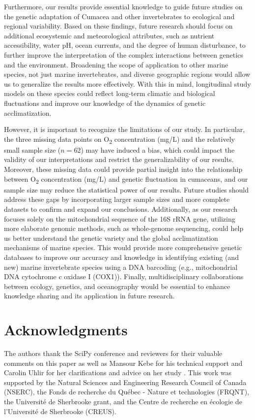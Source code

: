 Furthermore, our results provide essential knowledge to guide future studies on the genetic adaptation of Cumacea and other invertebrates to ecological and regional variability. Based on these findings, future research should focus on additional ecosystemic and meteorological attributes, such as nutrient accessibility, water pH, ocean currents, and the degree of human disturbance, to further improve the interpretation of the complex interactions between genetics and the environment. Broadening the scope of application to other marine species, not just marine invertebrates, and diverse geographic regions would allow us to generalize the results more effectively. With this in mind, longitudinal study models on these species could reflect long-term climatic and biological fluctuations and improve our knowledge of the dynamics of genetic acclimatization.

However, it is important to recognize the limitations of our study. In particular, the three missing data points on O\textsubscript{2} concentration (mg/L) and the relatively small sample size ($n=62$) may have induced a bias, which could impact the validity of our interpretations and restrict the generalizability of our results. Moreover, these missing data could provide partial insight into the relationship between O\textsubscript{2} concentration (mg/L) and genetic fluctuation in cumaceans, and our sample size may reduce the statistical power of our results. Future studies should address these gaps by incorporating larger sample sizes and more complete datasets to confirm and expand our conclusions. Additionally, as our research focuses solely on the mitochondrial sequence of the 16S rRNA gene, utilizing more elaborate genomic methods, such as whole-genome sequencing, could help us better understand the genetic variety and the global acclimatization mechanisms of marine species. This would provide more comprehensive genetic databases to improve our accuracy and knowledge in identifying existing (and new) marine invertebrate species using a DNA barcoding (e.g., mitochondrial DNA cytochrome c oxidase I (COX1)). Finally, multidisciplinary collaborations between ecology, genetics, and oceanography would be essential to enhance knowledge sharing and its application in future research.

\section{Acknowledgments}\label{acknowledgments}
The authors thank the SciPy conference and reviewers for their valuable comments on this paper as well as Mansour Kebe for his technical support and Carolin Uhlir for her clarifications and advice on her study \citep{uhlir_adding_2021}. This work was supported by the Natural Sciences and Engineering Research Council of Canada (NSERC), the Fonds de recherche du Québec - Nature et technologies (FRQNT), the Université de Sherbrooke grant, and the Centre de recherche en écologie de l’Université de Sherbrooke (CREUS).

